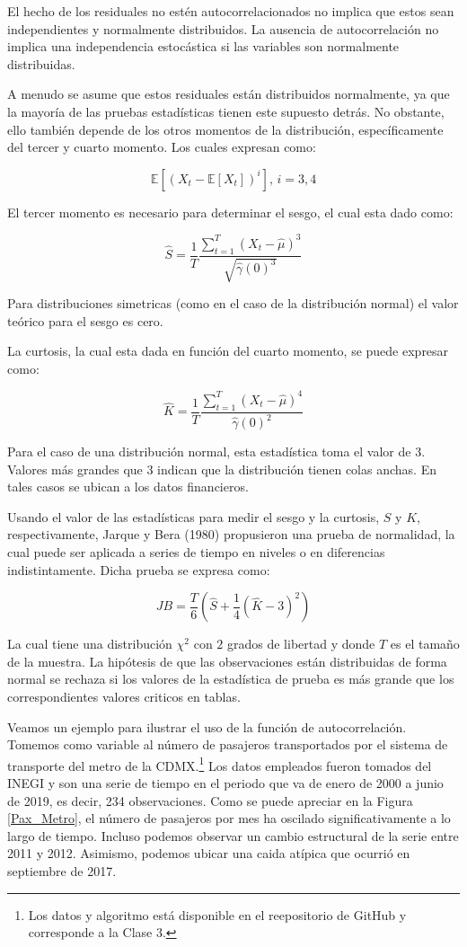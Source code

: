 \documentclass[
  a4paper,
]{article}
\begin{document}
El hecho de los residuales no estén autocorrelacionados no implica que
estos sean independientes y normalmente distribuidos. La ausencia de
autocorrelación no implica una independencia estocástica si las
variables son normalmente distribuidas.

A menudo se asume que estos residuales están distribuidos normalmente,
ya que la mayoría de las pruebas estadísticas tienen este supuesto
detrás. No obstante, ello también depende de los otros momentos de la
distribución, específicamente del tercer y cuarto momento. Los cuales
expresan como:

\[
\mathbb{E}[(X_t - \mathbb{E}[X_t])^i] \mbox{, } i = 3, 4
\]

El tercer momento es necesario para determinar el sesgo, el cual esta
dado como:

\[
\hat{S} = \frac{1}{T} \frac{\sum_{t = 1}^{T} (X_t - \hat{\mu})^3}{\sqrt{\hat{\gamma}(0)^3}}
\]

Para distribuciones simetricas (como en el caso de la distribución
normal) el valor teórico para el sesgo es cero.

La curtosis, la cual esta dada en función del cuarto momento, se puede
expresar como:

\[
\hat{K} = \frac{1}{T} \frac{\sum_{t = 1}^{T} (X_t - \hat{\mu})^4}{\hat{\gamma}(0)^2}
\]

Para el caso de una distribución normal, esta estadística toma el valor
de 3. Valores más grandes que 3 indican que la distribución tienen colas
anchas. En tales casos se ubican a los datos financieros.

Usando el valor de las estadísticas para medir el sesgo y la curtosis,
\(S\) y \(K\), respectivamente, Jarque y Bera (1980) propusieron una
prueba de normalidad, la cual puede ser aplicada a series de tiempo en
niveles o en diferencias indistintamente. Dicha prueba se expresa como:

\[
JB = \frac{T}{6} \left(\hat{S} + \frac{1}{4} (\hat{K} - 3)^2 \right) 
\]

La cual tiene una distribución \(\chi^2\) con \(2\) grados de libertad y
donde \(T\) es el tamaño de la muestra. La hipótesis de que las
observaciones están distribuidas de forma normal se rechaza si los
valores de la estadística de prueba es más grande que los
correspondientes valores criticos en tablas.

Veamos un ejemplo para ilustrar el uso de la función de autocorrelación.
Tomemos como variable al número de pasajeros transportados por el
sistema de transporte del metro de la
CDMX.\footnote{Los datos y algoritmo está disponible en el reepositorio de GitHub y corresponde a la Clase 3.}
Los datos empleados fueron tomados del INEGI y son una serie de tiempo
en el periodo que va de enero de 2000 a junio de 2019, es decir, 234
observaciones. Como se puede apreciar en la Figura \ref{Pax_Metro}, el
número de pasajeros por mes ha oscilado significativamente a lo largo de
tiempo. Incluso podemos observar un cambio estructural de la serie entre
2011 y 2012. Asimismo, podemos ubicar una caida atípica que ocurrió en
septiembre de 2017.
\end{document}
